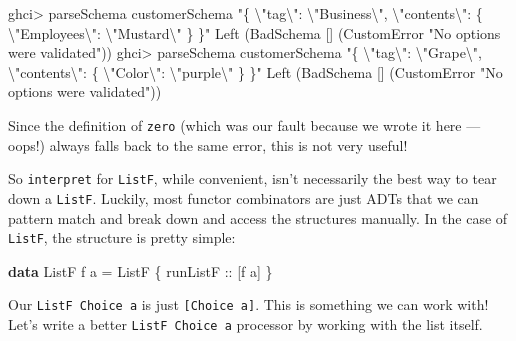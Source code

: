 \documentclass[]{article}
\newenvironment{Shaded}{}{}
\newcommand{\DataTypeTok}[1]{\textcolor[rgb]{0.56,0.13,0.00}{#1}}
\newcommand{\KeywordTok}[1]{\textcolor[rgb]{0.00,0.44,0.13}{\textbf{#1}}}
\newcommand{\NormalTok}[1]{#1}
\newcommand{\OperatorTok}[1]{\textcolor[rgb]{0.40,0.40,0.40}{#1}}
\newcommand{\OtherTok}[1]{\textcolor[rgb]{0.00,0.44,0.13}{#1}}
\newcommand{\StringTok}[1]{\textcolor[rgb]{0.25,0.44,0.63}{#1}}
\begin{document}
\begin{Shaded}
\begin{Highlighting}[]
\NormalTok{ghci}\OperatorTok{>}\NormalTok{ parseSchema customerSchema  }\StringTok{"\{ \textbackslash{}"tag\textbackslash{}": \textbackslash{}"Business\textbackslash{}", \textbackslash{}"contents\textbackslash{}": \{ \textbackslash{}"Employees\textbackslash{}": \textbackslash{}"Mustard\textbackslash{}" \} \}"}
\DataTypeTok{Left}\NormalTok{ (}\DataTypeTok{BadSchema}\NormalTok{ [] (}\DataTypeTok{CustomError} \StringTok{"No options were validated"}\NormalTok{))}
\NormalTok{ghci}\OperatorTok{>}\NormalTok{ parseSchema customerSchema  }\StringTok{"\{ \textbackslash{}"tag\textbackslash{}": \textbackslash{}"Grape\textbackslash{}", \textbackslash{}"contents\textbackslash{}": \{ \textbackslash{}"Color\textbackslash{}": \textbackslash{}"purple\textbackslash{}" \} \}"}
\DataTypeTok{Left}\NormalTok{ (}\DataTypeTok{BadSchema}\NormalTok{ [] (}\DataTypeTok{CustomError} \StringTok{"No options were validated"}\NormalTok{))}
\end{Highlighting}
\end{Shaded}

Since the definition of \texttt{zero} (which was our fault because we wrote it
here --- oops!) always falls back to the same error, this is not very useful!

So \texttt{interpret} for \texttt{ListF}, while convenient, isn't necessarily
the best way to tear down a \texttt{ListF}. Luckily, most functor combinators
are just ADTs that we can pattern match and break down and access the structures
manually. In the case of \texttt{ListF}, the structure is pretty simple:

\begin{Shaded}
\begin{Highlighting}[]
\KeywordTok{data} \DataTypeTok{ListF}\NormalTok{ f a }\OtherTok{=} \DataTypeTok{ListF}\NormalTok{ \{}\OtherTok{ runListF ::}\NormalTok{ [f a] \}}
\end{Highlighting}
\end{Shaded}

Our \texttt{ListF\ Choice\ a} is just \texttt{{[}Choice\ a{]}}. This is
something we can work with! Let's write a better \texttt{ListF\ Choice\ a}
processor by working with the list itself.
\end{document}
